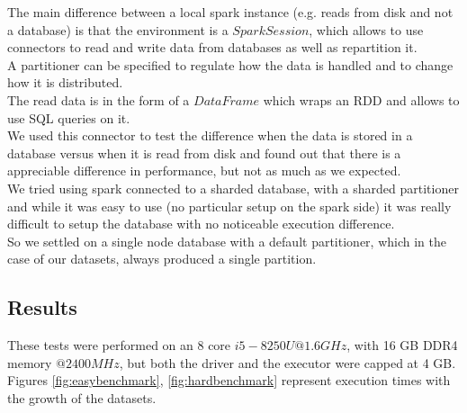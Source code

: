 \documentclass[a4paper]{article}
\begin{document}
	The main difference between a local spark instance (e.g. reads from disk and not a database) is that the environment is a $SparkSession$, which allows to use connectors to read and write data from databases as well as repartition it.\\
	A partitioner can be specified to regulate how the data is handled and to change how it is distributed.\\	
	The read data is in the form of a $DataFrame$ which wraps an RDD and allows to use SQL queries on it.\\

	We used this connector to test the difference when the data is stored in a database versus when it is read from disk and found out that there is a appreciable difference in performance, but not as much as we expected.\\

	We tried using spark connected to a sharded database, with a sharded partitioner and while it was easy to use (no particular setup on the spark side) it was really difficult to setup the database with no noticeable execution difference.\\
	So we settled on a single node database with a default partitioner, which in the case of our datasets, always produced a single partition.\\

	\subsection{Results}
	These tests were performed on an 8 core $i5-8250U @1.6GHz$, with 16 GB DDR4 memory $@2400MHz$, but both the driver and the executor were capped at 4 GB.\\
	Figures \ref{fig:easybenchmark}, \ref{fig:hardbenchmark} represent execution times with the growth of the datasets.\\
\end{document}
